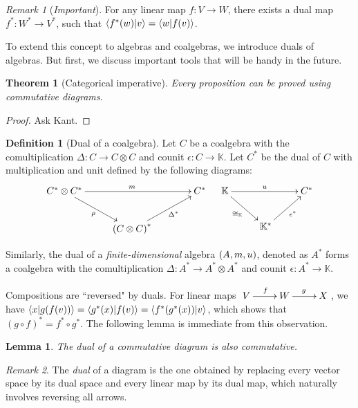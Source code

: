 \documentclass[svgnames]{article}
\newtheorem{Theorem}{Theorem}
\newtheorem{Lemma}{Lemma}
\theoremstyle{definition}
\newtheorem{Definition}{Definition}
\theoremstyle{remark}
\newtheorem*{Remark*}{Remark}
\theoremstyle{underline}
\theoremstyle{underline}
\begin{document}
 	\begin{Remark*}[\emph{Important}]
 		For any linear map $f \colon V \to W$, there exists a dual map $f^* \colon W^* \to V^*$, such that $\braket{f^*(w)}{v} = \braket{w}{f(v)}$.
 	\end{Remark*}

 	To extend this concept to algebras and coalgebras, we introduce duals of algebras. But first, we discuss important tools that will be handy in the future.

 	\begin{Theorem}[Categorical imperative]
 		Every proposition can be proved using commutative diagrams.	
 	\end{Theorem}

 	\begin{proof}
 		Ask Kant.
 	\end{proof}
 
 	\begin{Definition}[Dual of a coalgebra]
 		Let $C$ be a coalgebra with the comultiplication $\Delta \colon C \to C \otimes C$ and counit $\epsilon \colon C \to \mathbb K$. Let $C^*$ be the dual of $C$ with multiplication and unit defined by the following diagrams:
 		\begin{align*}
			\xymatrix@!C{
				C^* \otimes C^* \ar[rr]^{m} \ar[rd]_-{\rho} & & C^* \\
				& \pqty{C \otimes C}^* \ar[ru]_-{\Delta^*}
			} & &
			\xymatrix@!C{
				\mathbb K \ar[rr]^-{u} \ar[rd]_-{\cong_{\mathbb K}} & & C^* \\
				& \mathbb K^* \ar[ru]_-{\epsilon^*}
			}
		\end{align*}
 	\end{Definition}
 	Similarly, the dual of a \emph{finite-dimensional} algebra $\pqty{A, m, u}$, denoted as $A^*$ forms a coalgebra with the comultiplication $\Delta \colon A^* \to A^* \otimes A^*$ and counit $\epsilon \colon A^* \to \mathbb K$.
 	
 	Compositions are ``reversed" by duals. For linear maps $\xymatrix{V \ar[r]^f & W \ar[r]^g & X}$, we have $\braket{x}{g(f(v))} = \braket{g^*(x)}{f(v)} = \braket{f^*(g^*(x))}{v}$, which shows that $(g \circ f)^* = f^* \circ g^*$. The following lemma is immediate from this observation.
 	
 	\begin{Lemma}
 		The dual of a commutative diagram is also commutative.
 	\end{Lemma}
 	
 	\begin{Remark*}
 		The \emph{dual} of a diagram is the one obtained by replacing every vector space by its dual space and every linear map by its dual map, which naturally involves reversing all arrows.
 	\end{Remark*}
\end{document}
